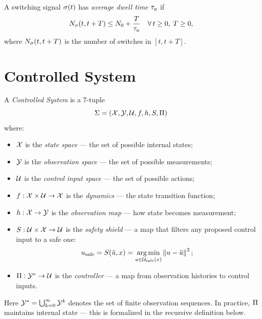 \documentclass[11pt,a4paper]{article}
\begin{document}
\begin{definition}
\label{def:dwell-time}
A switching signal $\sigma(t)$ has \emph{average dwell time} $\taua$ if
\begin{equation}
  N_\mode(t, t+T) \leq N_0 + \frac{T}{\taua}
  \quad \forall\, t \geq 0,\; T \geq 0,
\end{equation}
where $N_\sigma(t, t+T)$ is the number of switches in $[t, t+T]$.
\end{definition}


\section{Controlled System}
\label{sec:controlled-system}

\begin{definition}
\label{def:cs}
A \emph{Controlled System} is a 7-tuple
\begin{equation}
  \Sigma = (\mathcal{X}, \mathcal{Y}, \mathcal{U}, f, h, S, \Pi)
\end{equation}
where:
\begin{itemize}
  \item $\mathcal{X}$ is the \emph{state space} --- the set of possible internal states;
  \item $\mathcal{Y}$ is the \emph{observation space} --- the set of possible measurements;
  \item $\mathcal{U}$ is the \emph{control input space} --- the set of possible actions;
  \item $f : \mathcal{X} \times \mathcal{U} \to \mathcal{X}$ is the \emph{dynamics} --- the state
        transition function;
  \item $h : \mathcal{X} \to \mathcal{Y}$ is the \emph{observation map} --- how state becomes
        measurement;
  \item $S : \mathcal{U} \times \mathcal{X} \to \mathcal{U}$ is the \emph{safety shield} --- a map
        that filters any proposed control input to a safe one:
        \begin{equation}
          u_{\text{safe}} = S(\tilde{u}, x)
          = \operatorname*{arg\,min}_{u \in \mathcal{U}_{\text{safe}}(x)} \left\| u - \tilde{u} \right\|^2;
        \end{equation}
  \item $\Pi : \mathcal{Y}^* \to \mathcal{U}$ is the \emph{controller} --- a map from
        observation histories to control inputs.
\end{itemize}

Here $\mathcal{Y}^* = \bigcup_{k=0}^{\infty} \mathcal{Y}^k$ denotes the set of finite
observation sequences.  In practice, $\Pi$ maintains internal state --- this
is formalized in the recursive definition below.
\end{definition}
\end{document}
